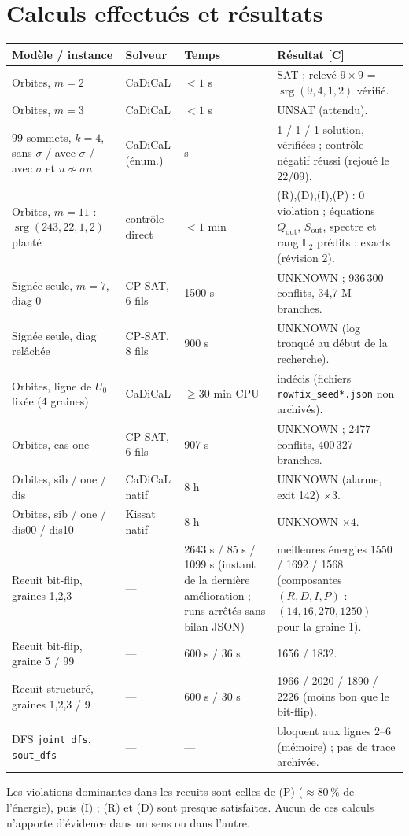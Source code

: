 \documentclass[11pt,a4paper]{article}
\theoremstyle{definition}
\theoremstyle{remark}
\newcommand{\F}{\mathbb{F}}
\newcommand{\srg}{\operatorname{srg}}
\newcommand{\Sout}{S_{\mathrm{out}}}
\newcommand{\Qout}{Q_{\mathrm{out}}}
\newcommand{\st}[1]{\textbf{[#1]}}
\newcommand{\code}[1]{\texttt{#1}}
\begin{document}
\section{Calculs effectués et résultats}\label{sec:calculs}
\begin{longtable}{p{3.9cm}p{2.6cm}p{2.2cm}p{5.8cm}}
\toprule
Modèle / instance & Solveur & Temps & Résultat \st{C}\\
\midrule
Orbites, $m=2$ & CaDiCaL & $<1$ s & SAT ; relevé $9\times9$ = $\srg(9,4,1,2)$ vérifié.\\
Orbites, $m=3$ & CaDiCaL & $<1$ s & UNSAT (attendu).\\
99 sommets, $k=4$, sans $\sigma$ / avec $\sigma$ / avec $\sigma$ et $u\not\sim\sigma u$ & CaDiCaL (énum.) & s & 1 / 1 / 1 solution, vérifiées ; contrôle négatif réussi (rejoué le 22/09).\\
Orbites, $m=11$ : $\srg(243,22,1,2)$ planté & contrôle direct & $<1$ min & (R),(D),(I),(P) : 0 violation ; équations $\Qout$, $\Sout$, spectre et rang $\F_2$ prédits : exacts (révision 2).\\
Signée seule, $m=7$, diag $0$ & CP-SAT, 6 fils & 1500 s & UNKNOWN ; 936\,300 conflits, 34,7 M branches.\\
Signée seule, diag relâchée & CP-SAT, 8 fils & 900 s & UNKNOWN (log tronqué au début de la recherche).\\
Orbites, ligne de $U_0$ fixée (4 graines) & CaDiCaL & $\ge30$ min CPU & indécis (fichiers \code{rowfix\_seed*.json} non archivés).\\
Orbites, cas one & CP-SAT, 6 fils & 907 s & UNKNOWN ; 2477 conflits, 400\,327 branches.\\
Orbites, sib / one / dis & CaDiCaL natif & 8 h & UNKNOWN (alarme, exit 142) $\times3$.\\
Orbites, sib / one / dis00 / dis10 & Kissat natif & 8 h & UNKNOWN $\times4$.\\
Recuit bit-flip, graines 1,2,3 & --- & 2643 s / 85 s / 1099 s (instant de la dernière amélioration ; runs arrêtés sans bilan JSON) & meilleures énergies 1550 / 1692 / 1568 (composantes $(R,D,I,P)$ : $(14,16,270,1250)$ pour la graine 1).\\
Recuit bit-flip, graine 5 / 99 & --- & 600 s / 36 s & 1656 / 1832.\\
Recuit structuré, graines 1,2,3 / 9 & --- & 600 s / 30 s & 1966 / 2020 / 1890 / 2226 (moins bon que le bit-flip).\\
DFS \code{joint\_dfs}, \code{sout\_dfs} & --- & --- & bloquent aux lignes 2--6 (mémoire) ; pas de trace archivée.\\
\bottomrule
\end{longtable}
Les violations dominantes dans les recuits sont celles de (P) ($\approx80\,\%$ de l'énergie), puis (I) ; (R) et (D) sont presque satisfaites. Aucun de ces calculs n'apporte d'évidence dans un sens ou dans l'autre.
\end{document}
